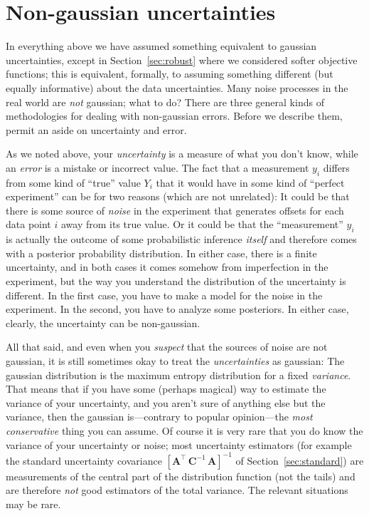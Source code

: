 \documentclass[12pt,twoside]{article}
\newcommand{\sectionname}{Section}
\newcommand{\mmatrix}[1]{\boldsymbol{#1}}
\newcommand{\inverse}[1]{{#1}^{-1}}
\newcommand{\transpose}[1]{{#1}^{\scriptscriptstyle \top}}
\newcommand{\mA}{\mmatrix{A}}
\newcommand{\mAT}{\transpose{\mA}}
\newcommand{\mC}{\mmatrix{C}}
\newcommand{\mCinv}{\inverse{\mC}}
\begin{document}
\section{Non-gaussian uncertainties}\label{sec:non-gaussian}

In everything above we have assumed something equivalent to gaussian
uncertainties, except in \sectionname~\ref{sec:robust} where we
considered softer objective functions; this is equivalent, formally,
to assuming something different (but equally informative) about the
data uncertainties.  Many noise processes in the real world are
\emph{not} gaussian; what to do?  There are three general kinds of
methodologies for dealing with non-gaussian errors.  Before we
describe them, permit an aside on uncertainty and error.

As we noted above, your \emph{uncertainty} is a measure of what you
don't know, while an \emph{error} is a mistake or incorrect value.
The fact that a measurement $y_i$ differs from some kind of ``true''
value $Y_i$ that it would have in some kind of ``perfect experiment''
can be for two reasons (which are not unrelated): It could be that
there is some source of \emph{noise} in the experiment that generates
offsets for each data point $i$ away from its true value.  Or it could
be that the ``measurement'' $y_i$ is actually the outcome of some
probabilistic inference \emph{itself} and therefore comes with a
posterior probability distribution.  In either case, there is a finite
uncertainty, and in both cases it comes somehow from imperfection in
the experiment, but the way you understand the distribution of the
uncertainty is different.  In the first case, you have to make a model
for the noise in the experiment.  In the second, you have to analyze
some posteriors.  In either case, clearly, the uncertainty can be
non-gaussian.

All that said, and even when you \emph{suspect} that the sources of
noise are not gaussian, it is still sometimes okay to treat the
\emph{uncertainties} as gaussian: The gaussian distribution is the
maximum entropy distribution for a fixed \emph{variance}.  That means
that if you have some (perhaps magical) way to estimate the variance
of your uncertainty, and you aren't sure of anything else but the
variance, then the gaussian is---contrary to popular opinion---the
\emph{most conservative} thing you can assume.  Of course it is very
rare that you do know the variance of your uncertainty or noise; most
uncertainty estimators (for example the standard uncertainty
covariance $\inverse{\left[\mAT\,\mCinv\,\mA\right]}$ of
\sectionname~\ref{sec:standard}) are measurements of the central part
of the distribution function (not the tails) and are therefore
\emph{not} good estimators of the total variance.  The relevant
situations may be rare.
\end{document}
